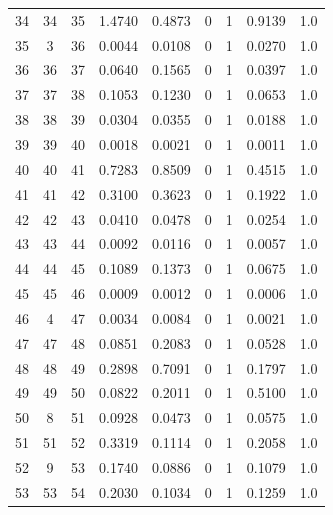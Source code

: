 \begin{longtable}{ccccccccc}
	34 & 34 & 35 & 1.4740 & 0.4873 & 0 & 1 & 0.9139 & 1.0 \\
	35 & 3 & 36 & 0.0044 & 0.0108 & 0 & 1 & 0.0270 & 1.0 \\
	36 & 36 & 37 & 0.0640 & 0.1565 & 0 & 1 & 0.0397 & 1.0 \\
	37 & 37 & 38 & 0.1053 & 0.1230 & 0 & 1 & 0.0653 & 1.0 \\
	38 & 38 & 39 & 0.0304 & 0.0355 & 0 & 1 & 0.0188 & 1.0\\
	39 & 39 & 40 & 0.0018 & 0.0021 & 0 & 1 & 0.0011 & 1.0 \\
	40 & 40 & 41 & 0.7283 & 0.8509 & 0 & 1 & 0.4515 & 1.0 \\
	41 & 41 & 42 & 0.3100 & 0.3623 & 0 & 1 & 0.1922 & 1.0 \\
	42 & 42 & 43 & 0.0410 & 0.0478 & 0 & 1 & 0.0254 & 1.0 \\ 
	43 & 43 & 44 & 0.0092 & 0.0116 & 0 & 1 & 0.0057 & 1.0 \\
	44 & 44 & 45 & 0.1089 & 0.1373 & 0 & 1 & 0.0675 & 1.0 \\
	45 & 45 & 46 & 0.0009 & 0.0012 & 0 & 1 & 0.0006 & 1.0 \\
	46 & 4 & 47 & 0.0034 & 0.0084 & 0 & 1 & 0.0021 & 1.0 \\
	47 & 47 & 48 & 0.0851 & 0.2083 & 0 & 1 & 0.0528 & 1.0 \\
	48 & 48 & 49 & 0.2898 & 0.7091 & 0 & 1 & 0.1797 & 1.0 \\
	49 & 49 & 50 & 0.0822 & 0.2011 & 0 & 1 & 0.5100 & 1.0 \\
	50 & 8 & 51 & 0.0928 & 0.0473 & 0 & 1 & 0.0575 & 1.0 \\
	51 & 51 & 52 & 0.3319 & 0.1114 & 0 & 1 & 0.2058 & 1.0 \\
	52 & 9 & 53 & 0.1740 & 0.0886 & 0 & 1 & 0.1079 & 1.0 \\
	53 & 53 & 54 & 0.2030 & 0.1034 & 0 & 1 & 0.1259 & 1.0 \\


\end{longtable}
